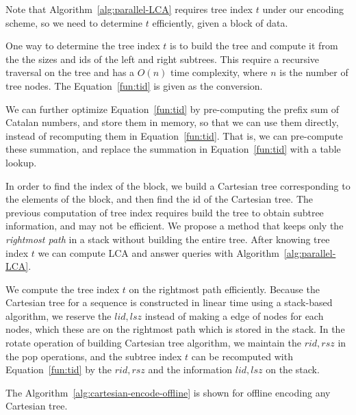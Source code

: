 Note that Algorithm~\ref{alg:parallel-LCA} requires tree index $t$
under our encoding scheme, so we need to determine $t$ efficiently,
given a block of data.


One way to determine the tree index $t$ is to build the tree and compute
it from the the sizes and ids of the left and right subtrees. This
require a recursive traversal on the tree and has a $O(n)$ time
complexity, where $n$ is the number of tree nodes.  The
Equation~\ref{fun:tid} is given as the conversion.

% 



We can further optimize Equation~\ref{fun:tid} by pre-computing the
prefix sum of Catalan numbers, and store them in memory, so that we can
use them directly, instead of recomputing them in
Equation~\ref{fun:tid}.  That is, we can pre-compute these summation,
and replace the summation in Equation~\ref{fun:tid} with a table lookup.


In order to find the index of the block, we build a Cartesian tree
corresponding to the elements of the block, and then find the id of the
Cartesian tree. The previous computation of tree index requires build
the tree to obtain subtree information, and may not be efficient.  We
propose a method that keeps only the {\em rightmost path} in a stack
without building the entire tree.  After knowing tree index $t$ we can
compute LCA and answer queries with Algorithm~\ref{alg:parallel-LCA}.

We compute the tree index $t$ on the rightmost path efficiently. Because
the Cartesian tree for a sequence is constructed in linear time using a
stack-based algorithm, we reserve the $\mathit{lid}, \mathit{lsz}$
instead of making a edge of nodes for each nodes, which these are on the
rightmost path which is stored in the stack.  In the rotate operation of
building Cartesian tree algorithm, we maintain the $\mathit{rid},
\mathit{rsz}$ in the pop operations, and the subtree index $t$ can be
recomputed with Equation~\ref{fun:tid} by the $\mathit{rid},
\mathit{rsz}$ and the information $\mathit{lid}, \mathit{lsz}$ on the
stack.

The Algorithm~\ref{alg:cartesian-encode-offline} is shown for offline
encoding any Cartesian tree.



